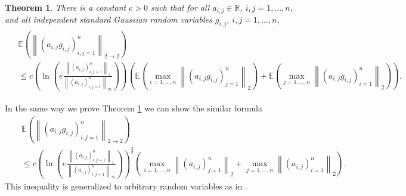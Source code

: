 \documentclass[12pt,a4paper]{article}
\newtheorem{satz}{Theorem}[section]
\newcommand{\R}{\ensuremath{{\mathbb R}}}
\newcommand{\Ex}{\mathbb{E}}
\newcommand{\norm}[1]{\left \lVert#1 \right\rVert}
\begin{document}
\begin{satz}\label{thm:gauss_part1gesamt} 
There is a constant $c>0$ such that for all
$a_{i,j}\in\R$, $i,j=1,...,n$, and all independent standard Gaussian random variables $g_{i,j}$, $i,j=1,...,n$, 
 \begin{eqnarray*}
	\left.\begin{split}
	&\Ex\left(\norm{(a_{i,j}g_{i,j})_{i,j=1}^n}_{2\rightarrow 2}\right)  \\
	&\leq c\left(\ln \left(e\frac{\norm{(a_{i,j})_{i,j=1}^n}_1}{\norm{(a_{i,j})_{i,j=1}^n}_{\infty}}\right)\right)^{}\left(\Ex\left(\max\limits_{i=1,...,n}\norm{(a_{i,j}g_{i,j})_{j=1}^n}_2\right)	+\Ex\left(\max\limits_{j=1,...,n}\norm{(a_{i,j}g_{i,j})_{i=1}^n}_2\right)\right).
	\end{split}\right.
	\end{eqnarray*}
\end{satz}
\vskip 3mm

In the same way we prove Theorem \ref{thm:gauss_part1gesamt} we can show the similar formula
\begin{eqnarray*}
	&&\Ex\left(\norm{(a_{i,j}g_{i,j})_{i,j=1}^n}_{2\rightarrow 2}\right)  \\
	&&\leq c\left(\ln\left(e\frac{\norm{(a_{i,j})_{i,j=1}^n}_1}{\norm{(a_{i,j})_{i,j=1}^n}_{\infty}}\right)\right)^{\frac{3}{2}}\left(\max\limits_{i=1,...,n}\norm{(a_{i,j})_{j=1}^n}_2				+\max\limits_{j=1,...,n}\norm{(a_{i,j})_{i=1}^n}_2\right).
		\end{eqnarray*}
This inequality is generalized to arbitrary random variables as in \cite{Lat}.
\vskip 3mm
\end{document}
